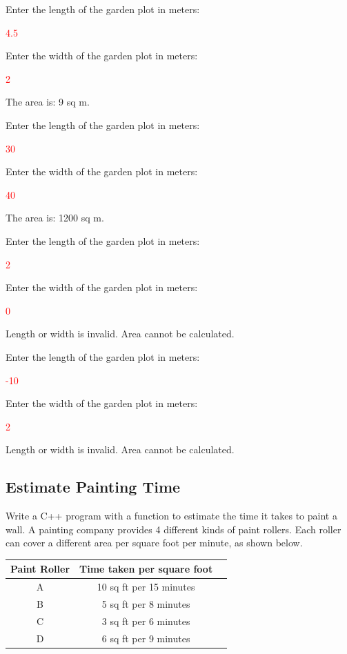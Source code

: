 \begin{sample}
Enter the length of the garden plot in meters:

 \textcolor{red}{4.5}
 
Enter the width of the garden plot in meters:

 \textcolor{red}{2}
 
The area is: 9 sq m.

\end{sample}

\begin{sample}
Enter the length of the garden plot in meters:

 \textcolor{red}{30}
 
Enter the width of the garden plot in meters:

 \textcolor{red}{40}
 
The area is: 1200 sq m.


\end{sample}

\begin{sample}
Enter the length of the garden plot in meters:

 \textcolor{red}{2}
 
Enter the width of the garden plot in meters:

 \textcolor{red}{0}
 
Length or width is invalid. Area cannot be calculated.
\end{sample}
\begin{sample}
Enter the length of the garden plot in meters:

 \textcolor{red}{-10}
 
Enter the width of the garden plot in meters:

 \textcolor{red}{2}
 
Length or width is invalid. Area cannot be calculated.

\end{sample}

\subsection{Estimate Painting Time}
Write a C++ program with a function to estimate the time it takes to paint a wall. A painting company provides 4 different kinds of paint rollers. Each roller can cover a different area per square foot per minute, as shown below.

\begin{table}[H]
    \centering
       \begin{tabular}{|c|c|c|}
    \hline
    \textbf{Paint Roller} & \textbf{Time taken per square foot} 
    \\
    \hline
    A & 10 sq ft per 15 minutes
    \\
    \hline
    B & 5 sq ft per 8 minutes 
    \\
    \hline
    C & 3 sq ft per 6 minutes \\
     \hline
    D & 6 sq ft per 9 minutes \\
    \hline
    \end{tabular}

\end{table}

